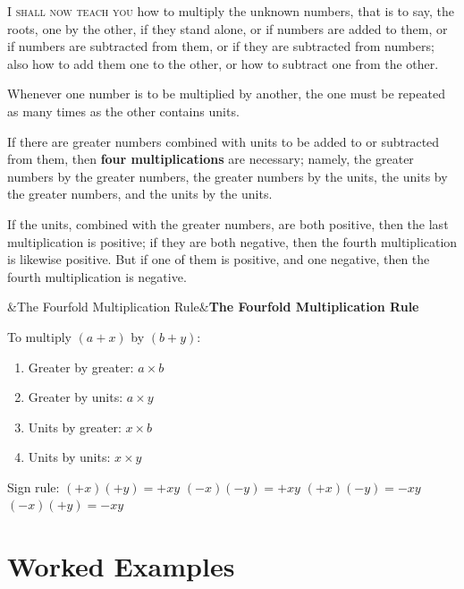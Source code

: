 \documentclass[11pt,a4paper,openany,oneside]{book}
\newenvironment{transbox}[1][]{%
  \smallskip\par\noindent
  \begin{lrbox}{\transboxsave}
  \begin{minipage}{\dimexpr\linewidth-2\fboxsep-2\fboxrule\relax}%
  \setlength{\parskip}{0.3em}%
  \ifx&#1&\else\textbf{#1}\\[0.2cm]\fi
}{%
  \end{minipage}%
  \end{lrbox}
  \fcolorbox{rulecolor}{transbg}{\usebox{\transboxsave}}%
  \smallskip}
\begin{document}
\begin{minipage}[t]{0.48\textwidth}
\raggedright

\lettrine[lines=2, lhang=0.33, nindent=0em, findent=3pt, loversize=0.14]{
\textcolor{dropgold}{I}}{ shall now teach you} how to multiply the unknown numbers, that is to say, the roots, one by the other, if they stand alone, or if numbers are added to them, or if numbers are subtracted from them, or if they are subtracted from numbers; also how to add them one to the other, or how to subtract one from the other.

Whenever one number is to be multiplied by another, the one must be repeated as many times as the other contains units.

If there are greater numbers combined with units to be added to or subtracted from them, then \textbf{four multiplications} are necessary; namely, the greater numbers by the greater numbers, the greater numbers by the units, the units by the greater numbers, and the units by the units.

If the units, combined with the greater numbers, are both positive, then the last multiplication is positive; if they are both negative, then the fourth multiplication is likewise positive. But if one of them is positive, and one negative, then the fourth multiplication is negative.

\begin{transbox}[The Fourfold Multiplication Rule]
To multiply $(a + x)$ by $(b + y)$:
\begin{enumerate}[label=\arabic*.,leftmargin=1.5em,topsep=1pt]
  \item Greater by greater: $a \times b$
  \item Greater by units: $a \times y$
  \item Units by greater: $x \times b$
  \item Units by units: $x \times y$
\end{enumerate}
Sign rule: $(+x)(+y) = +xy$ \quad $(-x)(-y) = +xy$ \quad $(+x)(-y) = -xy$ \quad $(-x)(+y) = -xy$
\end{transbox}

\end{minipage}
\vspace{0.3cm}

\newpage

\section*{Worked Examples}
\end{document}
